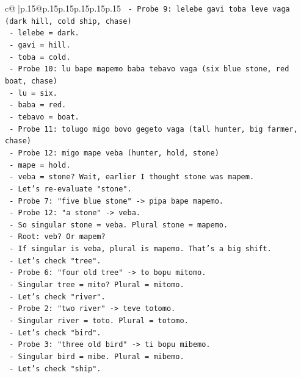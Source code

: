 \documentclass{article}
\begin{document}
{\begin{supertabular}{c@{$\;$}|p{.15\linewidth}@{}p{.15\linewidth}p{.15\linewidth}p{.15\linewidth}p{.15\linewidth}p{.15\linewidth}}
{{{\texttt{  {-} Probe 9: lelebe gavi toba leve vaga (dark hill, cold ship, chase)} \\
\texttt{    {-} lelebe = dark.} \\
\texttt{    {-} gavi = hill.} \\
\texttt{    {-} toba = cold.} \\
\texttt{  {-} Probe 10: lu bape mapemo baba tebavo vaga (six blue stone, red boat, chase)} \\
\texttt{    {-} lu = six.} \\
\texttt{    {-} baba = red.} \\
\texttt{    {-} tebavo = boat.} \\
\texttt{  {-} Probe 11: tolugo migo bovo gegeto vaga (tall hunter, big farmer, chase)} \\
\texttt{  {-} Probe 12: migo mape veba (hunter, hold, stone)} \\
\texttt{    {-} mape = hold.} \\
\texttt{    {-} veba = stone? Wait, earlier I thought stone was mapem.} \\
\texttt{    {-} Let's re{-}evaluate "stone".} \\
\texttt{    {-} Probe 7: "five blue stone" {-}> pipa bape mapemo.} \\
\texttt{    {-} Probe 12: "a stone" {-}> veba.} \\
\texttt{    {-} So singular stone = veba. Plural stone = mapemo.} \\
\texttt{    {-} Root: veb? Or mapem?} \\
\texttt{    {-} If singular is veba, plural is mapemo. That's a big shift.} \\
\texttt{    {-} Let's check "tree".} \\
\texttt{    {-} Probe 6: "four old tree" {-}> to bopu mitomo.} \\
\texttt{    {-} Singular tree = mito? Plural = mitomo.} \\
\texttt{    {-} Let's check "river".} \\
\texttt{    {-} Probe 2: "two river" {-}> teve totomo.} \\
\texttt{    {-} Singular river = toto. Plural = totomo.} \\
\texttt{    {-} Let's check "bird".} \\
\texttt{    {-} Probe 3: "three old bird" {-}> ti bopu mibemo.} \\
\texttt{    {-} Singular bird = mibe. Plural = mibemo.} \\
\texttt{    {-} Let's check "ship".} \\
}}}
\end{supertabular}}
\end{document}
